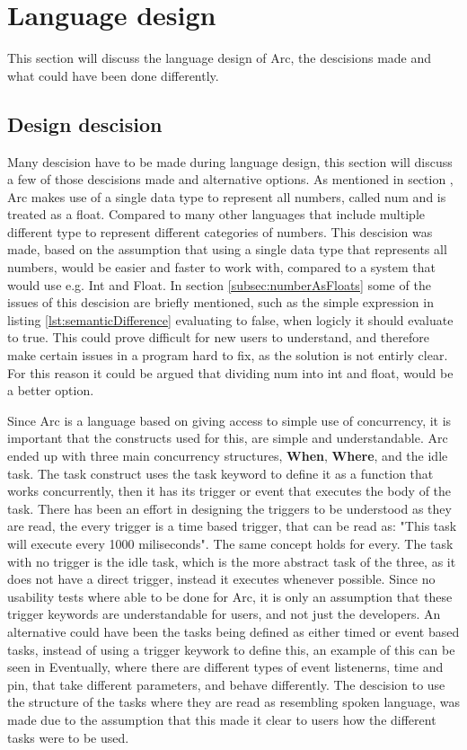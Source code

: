 \section{Language design}

This section will discuss the language design of Arc, the descisions made and what could have been done differently.

\subsection{Design descision} 
Many descision have to be made during language design, this section will discuss a few of those descisions made and alternative options.
As mentioned in section , Arc makes use of a single data type to represent all numbers, called num and is treated as a float. Compared to many other languages that include multiple different type to represent different categories of numbers. This descision was made, based on the assumption that using a single data type that represents all numbers, would be easier and faster to work with, compared to a system that would use e.g. Int and Float. In section \ref{subsec:numberAsFloats} some of the issues of this descision are briefly mentioned, such as the simple expression in listing \ref{lst:semanticDifference} evaluating to false, when logicly it should evaluate to true. This could prove difficult for new users to understand, and therefore make certain issues in a program hard to fix, as the solution is not entirly clear. For this reason it could be argued that dividing num into int and float, would be a better option. 

Since Arc is a language based on giving access to simple use of concurrency, it is important that the constructs used for this, are simple and understandable. Arc ended up with three main concurrency structures, \textbf{When}, \textbf{Where}, and the idle task. The task construct uses the task keyword to define it as a function that works concurrently, then it has its trigger or event that executes the body of the task. There has been an effort in designing the triggers to be understood as they are read, the every trigger is a time based trigger, that can be read as: "This task will execute every 1000 miliseconds". The same concept holds for every. The task with no trigger is the idle task, which is the more abstract task of the three, as it does not have a direct trigger, instead it executes whenever possible. Since no usability tests where able to be done for Arc, it is only an assumption that these trigger keywords are understandable for users, and not just the developers. An alternative could have been the tasks being defined as either timed or event based tasks, instead of using a trigger keywork to define this, an example of this can be seen in Eventually, where there are different types of event listenerns, time and pin, that take different parameters, and behave differently. The descision to use the structure of the tasks where they are read as resembling spoken language, was made due to the assumption that this made it clear to users how the different tasks were to be used.

